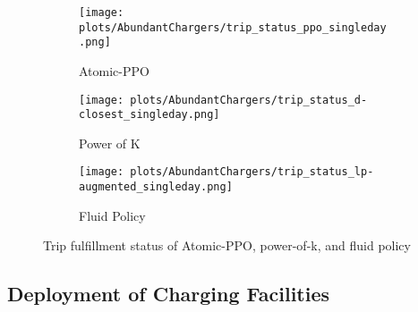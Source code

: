\begin{figure}[h]
    \centering
    \begin{subfigure}{\linewidth}
        \centering
        \texttt{[image: plots/AbundantChargers/trip\_status\_ppo\_singleday.png]}
        \caption{Atomic-PPO}
        \label{fig:trip-status-ppo}
    \end{subfigure}
    \begin{subfigure}{\linewidth}
        \centering
        \texttt{[image: plots/AbundantChargers/trip\_status\_d-closest\_singleday.png]}
        \caption{Power of K}
        \label{fig:trip-status-d-closest}
    \end{subfigure}
    \begin{subfigure}{\linewidth}
        \centering
        \texttt{[image: plots/AbundantChargers/trip\_status\_lp-augmented\_singleday.png]}
        \caption{Fluid Policy}
        \label{fig:trip-status-lp-augmented}
    \end{subfigure}
    \caption{Trip fulfillment status of Atomic-PPO, power-of-k, and fluid policy}
    \label{fig:trip-status}
\end{figure}

\subsection{Deployment of Charging Facilities} \label{subsec:charger-deployment}

